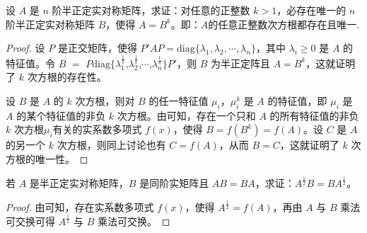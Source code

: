 \documentclass[../../main.tex]{subfiles}
\begin{document}
\begin{proposition}\label{proposition:例9.61}
设 \(A\) 是 \(n\) 阶半正定实对称矩阵，求证：对任意的正整数 \(k > 1\)，必存在唯一的 \(n\) 阶半正定实对称矩阵 \(B\)，使得 \(A = B^k\)。即：$A$的任意正整数次方根都存在且唯一.
\end{proposition}
\begin{proof}
设 \(P\) 是正交矩阵，使得 \(P'AP = \mathrm{diag}\{\lambda_1,\lambda_2,\cdots,\lambda_n\}\)，其中 \(\lambda_i \geqslant  0\) 是 \(A\) 的特征值。令 $B$ $=$ $P$$\mathrm{diag}$$\{$$\lambda_1^{\frac{1}{k}}$,$\lambda_2^{\frac{1}{k}}$,$\cdots$,$\lambda_n^{\frac{1}{k}}$$\}$$P'$，则 \(B\) 为半正定阵且 \(A = B^k\)，这就证明了 \(k\) 次方根的存在性。

设 \(B\) 是 \(A\) 的 \(k\) 次方根，则对 \(B\) 的任一特征值 \(\mu_i\)，\(\mu_i^k\) 是 \(A\) 的特征值，即 \(\mu_i\) 是 \(A\) 的某个特征值的非负 \(k\) 次方根。由可知，存在一个只和 \(A\) 的所有特征值的非负 \(k\) 次方根$\mu_i$有关的实系数多项式 \(f(x)\)，使得 \(B = f(B^k) = f(A)\)。设 \(C\) 是 \(A\) 的另一个 \(k\) 次方根，则同上讨论也有 \(C = f(A)\)，从而 \(B = C\)，这就证明了 \(k\) 次方根的唯一性。 

\end{proof}

\begin{proposition}\label{proposition:例9.62}
若 \(A\) 是半正定实对称矩阵，\(B\) 是同阶实矩阵且 \(AB = BA\)，求证：\(A^{\frac{1}{2}}B = BA^{\frac{1}{2}}\)。
\end{proposition}
\begin{proof}
由可知，存在实系数多项式 \(f(x)\)，使得 \(A^{\frac{1}{2}} = f(A)\)，再由 \(A\) 与 \(B\) 乘法可交换可得 \(A^{\frac{1}{2}}\) 与 \(B\) 乘法可交换。

\end{proof}
\end{document}
